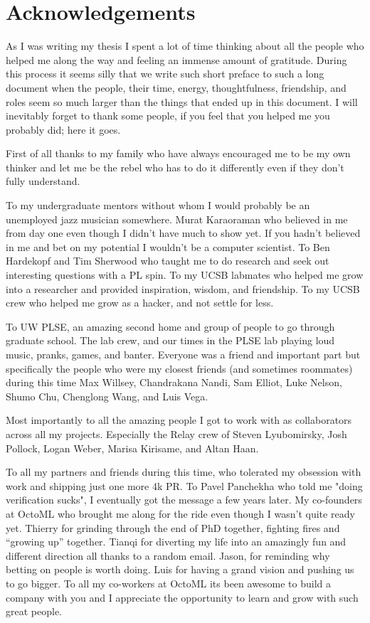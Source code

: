 \section{Acknowledgements}

As I was writing my thesis I spent a lot of time
    thinking about all the people who helped me along the way
    and feeling an immense amount of gratitude.
During this process it seems silly that we write such short preface to such a long
    document when the people, their time, energy, thoughtfulness, friendship,
    and roles seem so much larger than the things that ended up in this
    document.
I will inevitably forget to thank some people,
    if you feel that you helped me you probably did; here it goes.

First of all thanks to my family who have always encouraged
    me to be my own thinker and let me be the rebel who
    has to do it differently even if they don't fully understand.

To my undergraduate mentors without whom I would probably be an unemployed
    jazz musician somewhere.
Murat Karaoraman who believed in me from day one even though
    I didn't have much to show yet.
If you hadn't believed in me and bet on my potential
    I wouldn't be a computer scientist.
To Ben Hardekopf and Tim Sherwood who taught me to do research
    and seek out interesting questions with a PL spin.
To my UCSB labmates who helped me grow into a researcher and
    provided inspiration, wisdom, and friendship.
To my UCSB crew who helped me grow as a hacker, and
    not settle for less.

To UW PLSE, an amazing second home and group of people to
    go through graduate school.
The lab crew, and our times in the PLSE lab playing loud
    music, pranks, games, and banter.
Everyone was a friend and  important part but specifically the people
    who were my closest friends (and sometimes roommates)
    during this time Max Willsey, Chandrakana Nandi,
    Sam Elliot, Luke Nelson, Shumo Chu, Chenglong Wang, and Luis Vega.

Most importantly to all the amazing people I got to work
    with as collaborators across all my projects.
Especially the Relay crew of Steven Lyubomirsky,
    Josh Pollock, Logan Weber, Marisa Kirisame, and Altan Haan.

To all my partners and friends during this time, who tolerated
    my obsession with work and shipping just one more 4k PR.
To Pavel Panchekha who told me "doing verification sucks",
    I eventually got the message a few years later.
My co-founders at OctoML who brought me along for the ride
    even though I wasn't quite ready yet.
Thierry for grinding through the end of PhD together,
    fighting fires and ``growing up'' together.
Tianqi for diverting my life into an amazingly fun and
    different direction all thanks to a random email.
Jason, for reminding why betting on people is worth doing.
Luis for having a grand vision and pushing us to go
    bigger.
To all my co-workers at OctoML its been awesome to build
    a company with you and I appreciate the opportunity to
    learn and grow with such great people.


